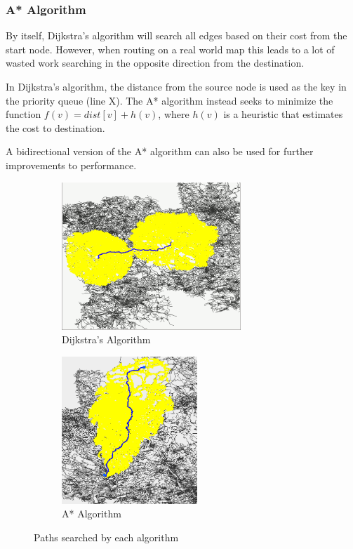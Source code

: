 \documentclass[ %
                    author={Alexander Hill},
                supervisor={Dr. Benjamin Sach},
                    degree={MEng},
                     title={MARMOSET: Multi Agent Real-time Multi-core Online
                     Simulation for Efficient Transportation},
                  subtitle={},
                      type={research},
                      year={2016} ]{dissertation}
\begin{document}
\subsubsection{A* Algorithm}

By itself, Dijkstra's algorithm will search all edges based on their cost from
the start node. However, when routing on a real world map this leads to a lot of
wasted work searching in the opposite direction from the destination.

In Dijkstra's algorithm, the distance from the source node is used as the key in
the priority queue (line X). The A* algorithm instead seeks to minimize the
function $f(v) = dist[v] + h(v)$, where $h(v)$ is a heuristic that estimates the
cost to destination.

A bidirectional version of the A* algorithm can also be used for further
improvements to performance.

\begin{figure}[h]
\centering
\begin{subfigure}[b]{0.4\textwidth}
    \centering
    \includegraphics[height=15em]{bidijkstra-city}
    \caption{Dijkstra's Algorithm}\label{fig:bidijkstra}
\end{subfigure}
\hspace{2em}
\begin{subfigure}[b]{0.4\textwidth}
    \centering
    \includegraphics[height=15em]{astar-city}
    \caption{A* Algorithm}\label{fig:astar}
\end{subfigure}
\caption{Paths searched by each algorithm}
\end{figure}
\end{document}
